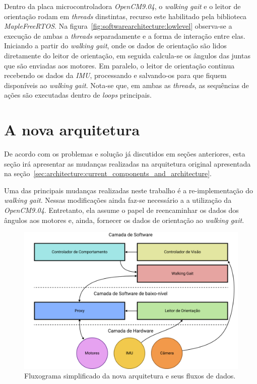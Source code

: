 Dentro da placa microcontroladora \textit{OpenCM9.04}, o \textit{walking gait} e o leitor de orientação rodam em \textit{threads} dinstintas, recurso este habilitado pela biblioteca \textit{MapleFreeRTOS}. Na figura~\ref{fig:softwarearchitecture:lowlevel} observa-se a execução de ambas a \textit{threads} separadamente e a forma de interação entre elas. Iniciando a partir do \textit{walking gait}, onde os dados de orientação são lidos diretamente do leitor de orientação, em seguida calcula-se os ângulos das juntas que são enviadas aos motores. Em paralelo, o leitor de orientação continua recebendo os dados da \textit{IMU}, processando e salvando-os para que fiquem disponíveis ao \textit{walking gait}. Nota-se que, em ambas as \textit{threads}, as sequências de ações são executadas dentro de \textit{loops} principais.

\section{A nova arquitetura}

De acordo com os problemas e solução já discutidos em seções anteriores, esta seção irá apresentar as mudanças realizadas na arquitetura original apresentada na seção~\ref{sec:architecture:current_components_and_architecture}.

Uma das principais mudanças realizadas neste trabalho é a re-implementação do \textit{walking gait}. Nessas modificações ainda faz-se necessário a a utilização da \textit{OpenCM9.04}. Entretanto, ela assume o papel de reencaminhar os dados dos ângulos aos motores e, ainda, fornecer os dados de orientação ao \textit{walking gait}.

\begin{figure}[h!]
	\centering
	\includegraphics[scale=1]{imagens/svg/softwarearchitecture-newproposal}
	\caption{Fluxograma simplificado da nova arquitetura e seus fluxos de dados.}
	\label{fig:softwarearchitecture:newproposal}
\end{figure}

